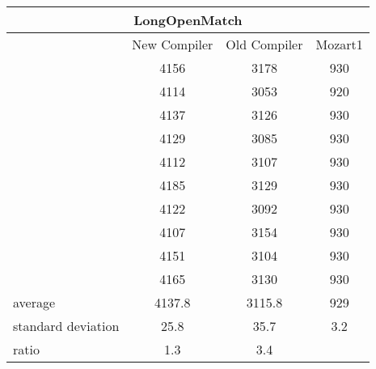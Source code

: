 \documentclass[a4paper]{memoir}
\begin{document}
\begin{appendices}
\begin{center}
\begin{tabular} {| l c c c|}
\hline
\multicolumn{4}{|c|}{\textbf{LongOpenMatch}} \\ \hline
  & New Compiler& Old Compiler & Mozart1 \\
  &         4156&  3178&  930\\ 
  &         4114&  3053&  920\\
  &         4137&  3126&  930\\
  &         4129&  3085&  930\\
  &         4112&  3107&  930\\
  &         4185&  3129&  930\\
  &         4122&  3092&  930\\
  &         4107&  3154&  930\\
  &         4151&  3104&  930\\
  &         4165&  3130&  930\\ \hline
average& 4137.8&  3115.8&  929\\
standard deviation& 25.8&  35.7&  3.2\\
ratio& 1.3& 3.4 & \\
\hline
\end{tabular}
\end{center}



















\end{appendices}
\end{document}
